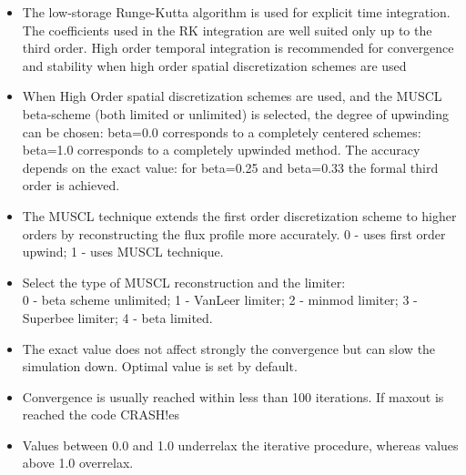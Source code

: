 \begin{itemize}

\item
{}
{The low-storage Runge-Kutta algorithm is used for explicit time integration.
The coefficients used in the RK integration are well suited only up to the
third order. High order temporal integration is recommended for 
convergence and stability when high order spatial discretization schemes 
are used}

\item
{}
{When High Order spatial discretization schemes are used, and the MUSCL 
beta-scheme (both limited or unlimited) is selected, the degree of upwinding
can be chosen: beta=0.0 corresponds to a completely centered schemes:
beta=1.0 corresponds to a completely upwinded method. The accuracy depends
on the exact value: for beta=0.25 and beta=0.33 the formal third order
is achieved.}

\item
{}
{The MUSCL technique extends the first order discretization
scheme to higher orders by reconstructing the flux profile more accurately.
0 - uses first order upwind; 1 - uses MUSCL technique.}

\item
{}
{Select the type of MUSCL reconstruction and the limiter:\\
0 - beta scheme unlimited; 1 - VanLeer limiter; 2 - minmod limiter;
3 - Superbee limiter; 4 - beta limited.}

\item
{}
{The exact value does not affect strongly the convergence but can slow
the simulation down. Optimal value is set by default.}

\item
{}
{Convergence is usually reached within less than 100 iterations. If maxout is reached the code CRASH!es}

\item
{}
{Values between 0.0 and 1.0 underrelax the iterative procedure, whereas
values above 1.0 overrelax.}


\end{itemize}
